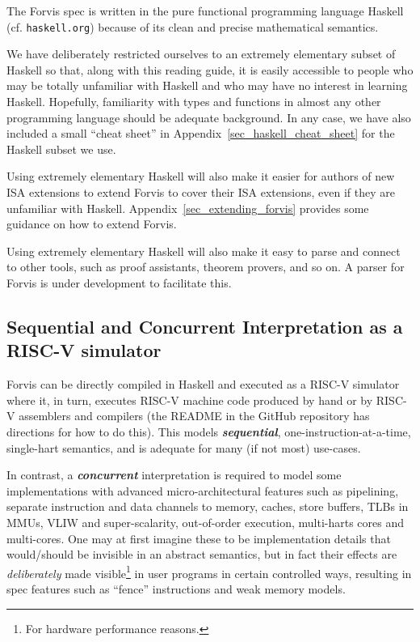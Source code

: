 \documentclass[11pt]{article}
\begin{document}
The Forvis spec is written in the pure functional programming language
Haskell~\cite{PeytonJones2003} (cf. {\tt haskell.org}) because of its
clean and precise mathematical semantics.

We have deliberately restricted ourselves to an extremely elementary
subset of Haskell so that, along with this reading guide, it is easily
accessible to people who may be totally unfamiliar with Haskell and
who may have no interest in learning Haskell.  Hopefully, familiarity
with types and functions in almost any other programming language
should be adequate background.  In any case, we have also included a
small ``cheat sheet'' in Appendix~\ref{sec_haskell_cheat_sheet} for
the Haskell subset we use.

Using extremely elementary Haskell will also make it easier for authors of
new ISA extensions to extend Forvis to cover their ISA extensions,
even if they are unfamiliar with Haskell.
Appendix~\ref{sec_extending_forvis} provides some guidance on how to
extend Forvis.

Using extremely elementary Haskell will also make it easy to parse and
connect to other tools, such as proof assistants, theorem provers, and
so on.  A parser for Forvis is under development to facilitate this.


\subsection{Sequential and Concurrent Interpretation as a RISC-V simulator}

\label{sec_sequential_and_concurrent}

Forvis can be directly compiled in Haskell and executed as a RISC-V
simulator where it, in turn, executes RISC-V machine code produced by
hand or by RISC-V assemblers and compilers (the README in the GitHub
repository has directions for how to do this).  This models
{\bf\emph{sequential}}, one-instruction-at-a-time, single-hart
semantics, and is adequate for many (if not most) use-cases.

In contrast, a {\bf\emph{concurrent}} interpretation is required to
model some implementations with advanced micro-architectural features
such as pipelining, separate instruction and data channels to memory,
caches, store buffers, TLBs in MMUs, VLIW and super-scalarity,
out-of-order execution, multi-harts cores and multi-cores.  One may at
first imagine these to be implementation details that would/should be
invisible in an abstract semantics, but in fact their effects are
\emph{deliberately} made visible\footnote{For hardware performance
reasons.} in user programs in certain controlled ways, resulting in
spec features such as ``fence'' instructions and weak memory models.
\end{document}
